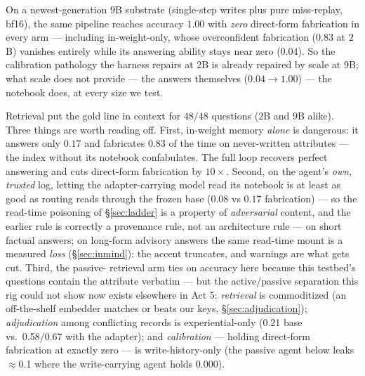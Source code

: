 \documentclass[11pt]{article}
\begin{document}
On a newest-generation $9$B substrate (single-step writes plus pure miss-replay, bf16), the
same pipeline reaches accuracy $1.00$ with \emph{zero} direct-form fabrication in every arm --- including
in-weight-only, whose overconfident fabrication ($0.83$ at $2$B) vanishes entirely while its
answering ability stays near zero ($0.04$). So the calibration pathology the harness repairs at
$2$B is already repaired by scale at $9$B; what scale does not provide --- the answers
themselves ($0.04 \to 1.00$) --- the notebook does, at every size we test.

Retrieval put the gold line in context for $48/48$ questions ($2$B and $9$B alike). Three
things are worth reading off. First, in-weight memory \emph{alone} is dangerous: it answers only $0.17$ and fabricates
$0.83$ of the time on never-written attributes --- the index without its notebook confabulates.
The full loop recovers perfect answering and cuts direct-form fabrication by $10\times$. Second, on the
agent's \emph{own, trusted} log, letting the adapter-carrying model read its notebook is at
least as good as routing reads through the frozen base ($0.08$ vs $0.17$ fabrication) --- so
the read-time poisoning of \S\ref{sec:ladder} is a property of \emph{adversarial} content, and
the earlier rule is correctly a provenance rule, not an architecture rule --- on short factual
answers; on long-form advisory answers the same read-time mount is a measured \emph{loss}
(\S\ref{sec:inmind}): the accent truncates, and warnings are what gets cut. Third, the passive-
retrieval arm ties on accuracy here because this testbed's questions contain the attribute
verbatim --- but the active/passive separation this rig could not show now exists elsewhere in
Act 5: \emph{retrieval} is commoditized (an off-the-shelf embedder matches or beats our keys,
\S\ref{sec:adjudication}); \emph{adjudication} among conflicting records is experiential-only
(0.21 base vs.\ 0.58/0.67 with the adapter); and \emph{calibration} --- holding direct-form
fabrication at exactly zero --- is write-history-only (the passive agent below leaks
$\approx$0.1 where the write-carrying agent holds 0.000).
\end{document}

